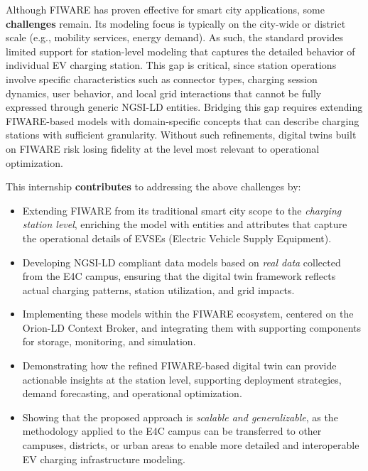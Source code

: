 Although FIWARE has proven effective
for smart city applications, some \textbf{challenges} remain. Its modeling focus is typically on the
city-wide or district scale (e.g., mobility services, energy demand). As such, the standard provides limited
support for station-level modeling that captures the detailed behavior
of individual EV charging station. This gap is critical, since station
operations involve specific characteristics such as connector types,
charging session dynamics, user behavior, and local grid interactions
that cannot be fully expressed through generic NGSI-LD entities.
Bridging this gap requires extending FIWARE-based models with
domain-specific concepts that can describe charging stations with
sufficient granularity. Without such refinements, digital twins built on
FIWARE risk losing fidelity at the level most relevant to operational
optimization.

This internship \textbf{contributes} to addressing the above challenges by:
\begin{itemize}
  \item Extending FIWARE from its traditional smart city
  scope to the \emph{charging station level}, enriching the model with
  entities and attributes that capture the operational details of EVSEs
  (Electric Vehicle Supply Equipment).
  \item Developing NGSI-LD compliant data models based on \emph{real
  data} collected from the E4C campus, ensuring that the digital twin
  framework reflects actual charging patterns, station utilization, and
  grid impacts.
  \item Implementing these models within the FIWARE ecosystem,
  centered on the Orion-LD Context Broker, and integrating them with
  supporting components for storage, monitoring, and simulation.
  \item Demonstrating how the refined FIWARE-based digital twin can
  provide actionable insights at the station level, supporting deployment
  strategies, demand forecasting, and operational optimization.
  \item Showing that the proposed approach is \emph{scalable and
  generalizable}, as the methodology applied to the E4C campus can
  be transferred to other campuses, districts, or urban areas to enable
  more detailed and interoperable EV charging infrastructure modeling.
\end{itemize}







